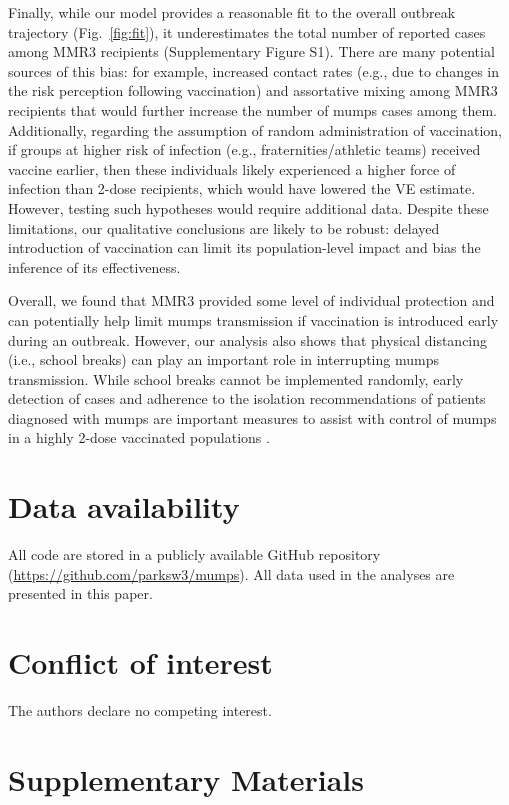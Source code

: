 \documentclass[12pt]{article}
\newcommand{\fref}[1]{Fig.~\ref{fig:#1}}
\begin{document}
Finally, while our model provides a reasonable fit to the overall outbreak trajectory (\fref{fit}), it underestimates the total number of reported cases among MMR3 recipients (Supplementary Figure S1).
There are many potential sources of this bias: for example, increased contact rates (e.g., due to changes in the risk perception following vaccination) and assortative mixing among MMR3 recipients that would further increase the number of mumps cases among them.
Additionally, regarding the assumption of random administration of vaccination, if groups at higher risk of infection (e.g., fraternities/athletic teams) received vaccine earlier, then these individuals likely experienced a higher force of infection than 2-dose recipients, which would have lowered the VE estimate. 
However, testing such hypotheses would require additional data.
Despite these limitations, our qualitative conclusions are likely to be robust: delayed introduction of vaccination can limit its population-level impact and bias the inference of its effectiveness.

Overall, we found that MMR3 provided some level of individual protection and can potentially help limit mumps transmission if vaccination is introduced early during an outbreak.  
However, our analysis also shows that physical distancing (i.e., school breaks) can play an important role in interrupting mumps transmission. 
While school breaks cannot be implemented randomly, early detection of cases and adherence to the isolation recommendations of patients diagnosed with mumps are important measures to assist with control of mumps in a highly 2-dose vaccinated populations \citep{shah2022containing}.

\section*{Data availability}

All code are stored in a publicly available GitHub repository (\url{https://github.com/parksw3/mumps}). All data used in the analyses are presented in this paper.

\section*{Conflict of interest}

The authors declare no competing interest.

\pagebreak

\section*{Supplementary Materials}
\end{document}
